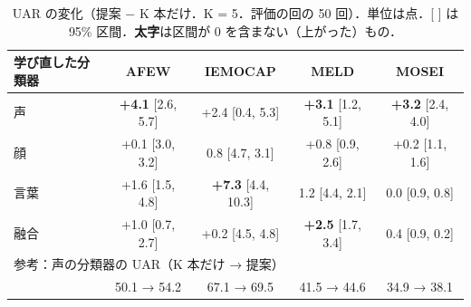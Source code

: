\documentclass[a4paper,11pt]{ltjsarticle}
\begin{document}
\begin{table}[H]
\centering
\caption{UAR の変化（提案 − K 本だけ．K = 5．評価の回の 50 回）．単位は点．[ ] は 95\% 区間．\textbf{太字}は区間が 0 を含まない（上がった）もの．}
\label{tab:gain}
\small
\begin{tabular}{lcccc}
\toprule
学び直した分類器 & AFEW & IEMOCAP & MELD & MOSEI \\
\midrule
\textcolor{cA}{声} & \textbf{+4.1} [2.6, 5.7] & +2.4 [\textminus{}0.4, 5.3] & \textbf{+3.1} [1.2, 5.1] & \textbf{+3.2} [2.4, 4.0] \\
\textcolor{cV}{顔} & +0.1 [\textminus{}3.0, 3.2] & \textminus{}0.8 [\textminus{}4.7, 3.1] & +0.8 [\textminus{}0.9, 2.6] & +0.2 [\textminus{}1.1, 1.6] \\
\textcolor{cT}{言葉} & +1.6 [\textminus{}1.5, 4.8] & \textbf{+7.3} [4.4, 10.3] & \textminus{}1.2 [\textminus{}4.4, 2.1] & \textminus{}0.0 [\textminus{}0.9, 0.8] \\
\textcolor{cF}{融合} & +1.0 [\textminus{}0.7, 2.7] & +0.2 [\textminus{}4.5, 4.8] & \textbf{+2.5} [1.7, 3.4] & \textminus{}0.4 [\textminus{}0.9, 0.2] \\
\midrule
\multicolumn{5}{l}{\small 参考：声の分類器の UAR（K 本だけ → 提案）} \\
 & 50.1 → 54.2 & 67.1 → 69.5 & 41.5 → 44.6 & 34.9 → 38.1 \\
\bottomrule
\end{tabular}
\end{table}
\end{document}
